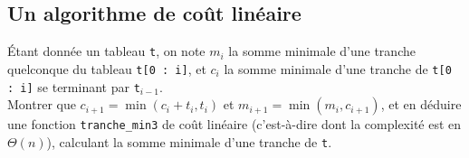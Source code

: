 \subsection{Un algorithme de coût linéaire}
 
Étant donnée un tableau \texttt{t}, on note $m_i$ la somme minimale d'une tranche quelconque du 
tableau \texttt{t[0 : i]}, et $c_i$ la somme minimale d'une tranche de \texttt{t[0 : i]} se 
terminant par \texttt{t$_{i-1}$}.\\
 
Montrer que $c_{i+1} = \min(c_i + t_i , t_i )$ et $m_{i+1} = \min(m_i , c_{i+1})$, et en déduire 
une fonction \texttt{tranche\_min3} de coût linéaire (c'est-à-dire dont la complexité est en 
$\Theta(n)$), calculant la somme minimale d'une tranche de \texttt{t}.
